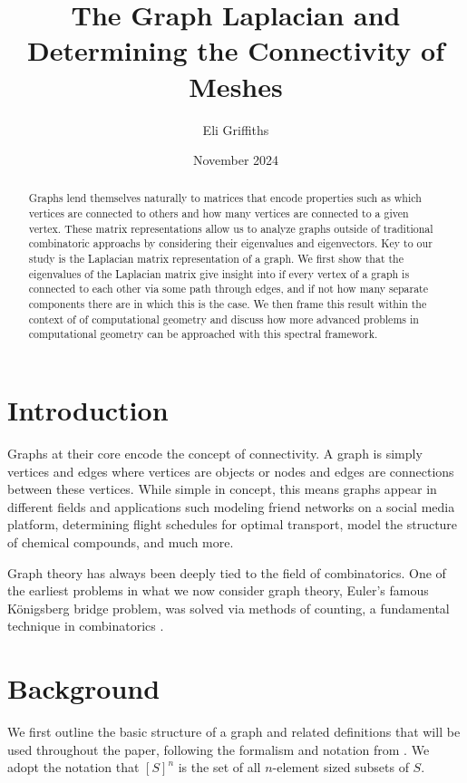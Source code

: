 \documentclass[11pt]{article}
\title{The Graph Laplacian and Determining the Connectivity of Meshes}
\author{Eli Griffiths}
\date{November 2024}
\begin{document}
\maketitle

\begin{abstract}
    Graphs lend themselves naturally to matrices that encode properties such as which vertices are connected to others and how many vertices are connected to a given vertex. These matrix representations allow us to analyze graphs outside of traditional combinatoric approachs by considering their eigenvalues and eigenvectors. Key to our study is the Laplacian matrix representation of a graph. We first show that the eigenvalues of the Laplacian matrix give insight into if every vertex of a graph is connected to each other via some path through edges, and if not how many separate components there are in which this is the case. We then frame this result within the context of of computational geometry and discuss how more advanced problems in computational geometry can be approached with this spectral framework.
\end{abstract}

\section{Introduction}

Graphs at their core encode the concept of connectivity. A graph is simply vertices and edges where vertices are objects or nodes and edges are connections between these vertices. While simple in concept, this means graphs appear in different fields and applications such modeling friend networks on a social media platform, determining flight schedules for optimal transport, model the structure of chemical compounds, and much more.

Graph theory has always been deeply tied to the field of combinatorics. One of the earliest problems in what we now consider graph theory, Euler's famous K\"onigsberg bridge problem, was solved via methods of counting, a fundamental technique in combinatorics \cite{wilson2013combinatorics}.



\section{Background}

We first outline the basic structure of a graph and related definitions that will be used throughout the paper, following the formalism and notation from \cite{diestelGraphTheory2017}. We adopt the notation that $[S]^n$ is the set of all $n$-element sized subsets of $S$.
\end{document}
